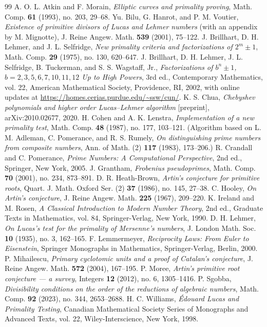 \documentclass[12pt]{article}
\theoremstyle{plain}
\theoremstyle{definition}
\theoremstyle{remark}
\begin{document}
\begin{thebibliography}{99}
 A. O. L. Atkin and F. Morain, \emph{Elliptic curves and primality proving}, Math. Comp. \textbf{61} (1993), no. 203, 29--68.
 Yu. Bilu, G. Hanrot, and P. M. Voutier, \emph{Existence of primitive divisors of Lucas and Lehmer numbers} (with an appendix by M. Mignotte), J. Reine Angew. Math. \textbf{539} (2001), 75--122.
 J. Brillhart, D. H. Lehmer, and J. L. Selfridge, \emph{New primality criteria and factorizations of \(2^m \pm 1\)}, Math. Comp. \textbf{29} (1975), no. 130, 620--647.
 J. Brillhart, D. H. Lehmer, J. L. Selfridge, B. Tuckerman, and S. S. Wagstaff, Jr., \emph{Factorizations of \(b^n \pm 1\), \(b = 2, 3, 5, 6, 7, 10, 11, 12\) Up to High Powers}, 3rd ed., Contemporary Mathematics, vol. 22, American Mathematical Society, Providence, RI, 2002, with online updates at \url{https://homes.cerias.purdue.edu/~ssw/cun/}.
 K. S. Chua, \emph{Chebyshev polynomials and higher order Lucas--Lehmer algorithm} [preprint], arXiv:2010.02677, 2020.
 H. Cohen and A. K. Lenstra, \emph{Implementation of a new primality test}, Math. Comp. \textbf{48} (1987), no. 177, 103--121. (Algorithm based on L. M. Adleman, C. Pomerance, and R. S. Rumely, \emph{On distinguishing prime numbers from composite numbers}, Ann. of Math. (2) \textbf{117} (1983), 173--206.)
 R. Crandall and C. Pomerance, \emph{Prime Numbers: A Computational Perspective}, 2nd ed., Springer, New York, 2005.
 J. Grantham, \emph{Frobenius pseudoprimes}, Math. Comp. \textbf{70} (2001), no. 234, 873--891.
 D. R. Heath-Brown, \emph{Artin's conjecture for primitive roots}, Quart. J. Math. Oxford Ser. (2) \textbf{37} (1986), no. 145, 27--38.
 C. Hooley, \emph{On Artin's conjecture}, J. Reine Angew. Math. \textbf{225} (1967), 209--220.
 K. Ireland and M. Rosen, \emph{A Classical Introduction to Modern Number Theory}, 2nd ed., Graduate Texts in Mathematics, vol. 84, Springer-Verlag, New York, 1990.
 D. H. Lehmer, \emph{On Lucas's test for the primality of Mersenne's numbers}, J. London Math. Soc. \textbf{10} (1935), no. 3, 162--165.
 F. Lemmermeyer, \emph{Reciprocity Laws: From Euler to Eisenstein}, Springer Monographs in Mathematics, Springer-Verlag, Berlin, 2000.
 P. Mihailescu, \emph{Primary cyclotomic units and a proof of Catalan's conjecture}, J. Reine Angew. Math. \textbf{572} (2004), 167--195.
 P. Moree, \emph{Artin's primitive root conjecture --- a survey}, Integers \textbf{12} (2012), no. 6, 1305--1416.
 P. Sgobba, \emph{Divisibility conditions on the order of the reductions of algebraic numbers}, Math. Comp. \textbf{92} (2023), no. 344, 2653--2688.
 H. C. Williams, \emph{Édouard Lucas and Primality Testing}, Canadian Mathematical Society Series of Monographs and Advanced Texts, vol. 22, Wiley-Interscience, New York, 1998.
\end{thebibliography}
\end{document}
